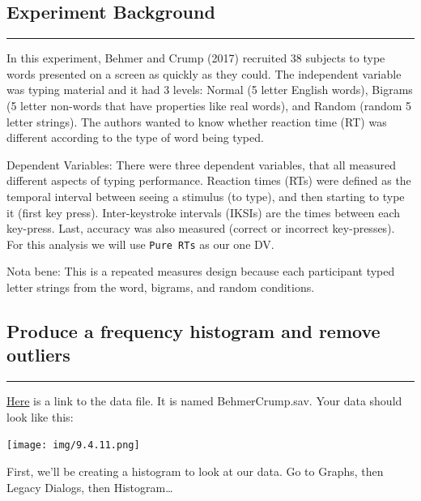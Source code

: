 \documentclass[
]{book}
\begin{document}
\hypertarget{experiment-background-5}{%
\subsection{Experiment Background}\label{experiment-background-5}}

\begin{center}\rule{0.5\linewidth}{0.5pt}\end{center}

In this experiment, Behmer and Crump (2017) recruited 38 subjects to type words presented on a screen as quickly as they could. The independent variable was typing material and it had 3 levels: Normal (5 letter English words), Bigrams (5 letter non-words that have properties like real words), and Random (random 5 letter strings). The authors wanted to know whether reaction time (RT) was different according to the type of word being typed.

Dependent Variables: There were three dependent variables, that all measured different aspects of typing performance. Reaction times (RTs) were defined as the temporal interval between seeing a stimulus (to type), and then starting to type it (first key press). Inter-keystroke intervals (IKSIs) are the times between each key-press. Last, accuracy was also measured (correct or incorrect key-presses). For this analysis we will use \texttt{Pure\ RTs} as our one DV.

Nota bene: This is a repeated measures design because each participant typed letter strings from the word, bigrams, and random conditions.

\hypertarget{produce-a-frequency-histogram-and-remove-outliers}{%
\subsection{Produce a frequency histogram and remove outliers}\label{produce-a-frequency-histogram-and-remove-outliers}}

\begin{center}\rule{0.5\linewidth}{0.5pt}\end{center}

\href{https://github.com/CrumpLab/statisticsLab/blob/master/data/spssdata/BehmerCrump.sav}{Here} is a link to the data file. It is named BehmerCrump.sav. Your data should look like this:

\texttt{[image: img/9.4.11.png]}

First, we'll be creating a histogram to look at our data. Go to {Graphs}, then {Legacy Dialogs}, then {Histogram\ldots{}}
\end{document}
